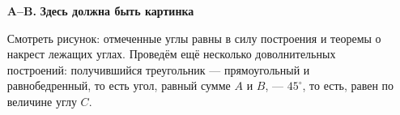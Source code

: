 \begin{itemize}

\item[\bf A–B.] {\bf Здесь должна быть картинка}


Смотреть рисунок: отмеченные углы равны в силу построения и теоремы о накрест лежащих углах. Проведём ещё несколько доволнительных построений: получившийся треугольник — прямоугольный и равнобедренный, то есть угол, равный сумме $A$ и $B$, — $45^\circ$, то есть, равен по величине углу $C$.
\end{itemize}